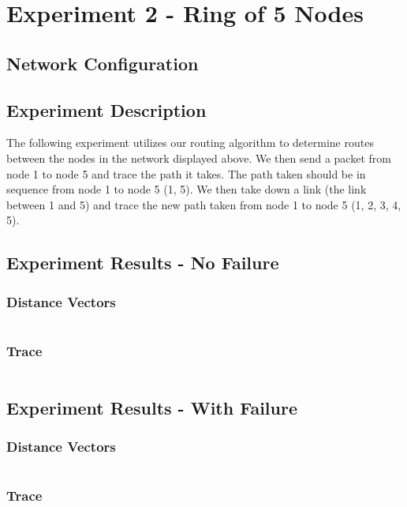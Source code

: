 \documentclass[fleqn,11pt]{article}
\begin{document}
\section{Experiment 2 - Ring of 5 Nodes}
  \subsection{Network Configuration}
    
  \subsection{Experiment Description}
    The following experiment utilizes our routing algorithm to determine routes
    between the nodes in the network displayed above. We then send a packet
    from node 1 to node 5 and trace the path it takes. The path taken should be
    in sequence from node 1 to node 5 (1, 5). We then take down a link
    (the link between 1 and 5) and trace the new path taken from node 1 to
    node 5 (1, 2, 3, 4, 5).

  \subsection{Experiment Results - No Failure}
  \subsubsection{Distance Vectors}
    \begin{verbatim}
    \end{verbatim}
  \subsubsection{Trace}
    \begin{verbatim}
    \end{verbatim}

  \subsection{Experiment Results - With Failure}
  \subsubsection{Distance Vectors}
    \begin{verbatim}
    \end{verbatim}
  \subsubsection{Trace}
    \begin{verbatim}
    \end{verbatim}
\end{document}
